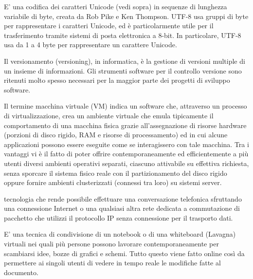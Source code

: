 \documentclass{scalatekids-article}
\begin{document}
   E' una codifica dei caratteri Unicode (vedi sopra) in sequenze di lunghezza variabile di byte, creata da Rob Pike e Ken Thompson. UTF-8 usa gruppi di byte per rappresentare i caratteri Unicode, ed è particolarmente utile per il trasferimento tramite sistemi di posta elettronica a 8-bit.
  In particolare, UTF-8 usa da 1 a 4 byte per rappresentare un carattere Unicode.


   Il versionamento (versioning), in informatica, è la gestione di versioni multiple di un insieme di informazioni.
  Gli strumenti software per il controllo versione sono ritenuti molto spesso necessari per la maggior parte dei progetti di sviluppo software.

   Il termine macchina virtuale (VM) indica un software che, attraverso un processo di virtualizzazione, crea un ambiente virtuale che emula tipicamente il comportamento di una macchina fisica grazie all'assegnazione di risorse hardware (porzioni di disco rigido, RAM e risorse di processamento) ed in cui alcune applicazioni possono essere eseguite come se interagissero con tale macchina.
  Tra i vantaggi vi è il fatto di poter offrire contemporaneamente ed efficientemente a più utenti diversi ambienti operativi separati, ciascuno attivabile su effettiva richiesta, senza sporcare il sistema fisico reale con il partizionamento del disco rigido oppure fornire ambienti clusterizzati (connessi tra loro) su sistemi server.

   tecnologia che rende possibile effettuare una conversazione telefonica sfruttando una connessione Internet o una qualsiasi altra rete dedicata a commutazione di pacchetto che utilizzi il protocollo IP senza connessione per il trasporto dati.


   E' una tecnica di condivisione di un notebook o di una whiteboard (Lavagna) virtuali nei quali più persone possono lavorare contemporaneamente per scambiarsi idee, bozze di grafici e schemi.
  Tutto questo viene fatto online così da permettere ai singoli utenti di vedere in tempo reale le modifiche fatte al documento.



\end{document}
